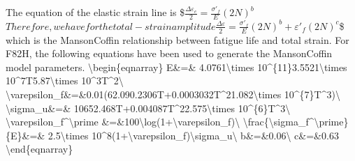 \documentclass[letterpaper,10pt,english]{jupyterBook}
\begin{document}
	\sphinxAtStartPar
	The equation of the elastic strain line is
	\$\(\frac{\Delta \varepsilon_e}{2}=\frac{\sigma'_f}{E} (2N)^b\)\(
	Therefore, we have for the total-strain amplitude
	\)\(\frac{\Delta \varepsilon}{2}=\frac{\sigma'_f}{E} (2N)^b+\varepsilon'_f (2N)^c\)\$
	which is the Manson\sphinxhyphen{}Coffin relationship between fatigue life and total strain.  For F82H, the following equations have been used to generate the Manson\sphinxhyphen{}Coffin model parameters.
	\textbackslash{}begin\{eqnarray\}
	E\&=\& 4.0761\textbackslash{}times 10\textasciicircum{}\{11\}\sphinxhyphen{}3.5521\textbackslash{}times 10\textasciicircum{}7T\sphinxhyphen{}5.87\textbackslash{}times 10\textasciicircum{}3T\textasciicircum{}2\textbackslash{}
	\textbackslash{}varepsilon\_f\&=\&0.01(62.09\sphinxhyphen{}0.2306T+0.0003032T\textasciicircum{}2\sphinxhyphen{}1.082\textbackslash{}times 10\textasciicircum{}\{\sphinxhyphen{}7\}T\textasciicircum{}3)\textbackslash{}
	\textbackslash{}sigma\_u\&=\& 1065\sphinxhyphen{}2.468T+0.004087T\textasciicircum{}2\sphinxhyphen{}2.575\textbackslash{}times 10\textasciicircum{}\{\sphinxhyphen{}6\}T\textasciicircum{}3\textbackslash{}
	\textbackslash{}varepsilon\_f\textasciicircum{}\textbackslash{}prime \&=\&100\textbackslash{}log(1+\textbackslash{}varepsilon\_f)\textbackslash{}
	\textbackslash{}frac\{\textbackslash{}sigma\_f\textasciicircum{}\textbackslash{}prime\}\{E\}\&=\& 2.5\textbackslash{}times 10\textasciicircum{}8(1+\textbackslash{}varepsilon\_f)\textbackslash{}sigma\_u\textbackslash{}
	b\&=\&\sphinxhyphen{}0.06\textbackslash{}
	c\&=\&\sphinxhyphen{}0.63
	\textbackslash{}end\{eqnarray\}
	
\end{document}
